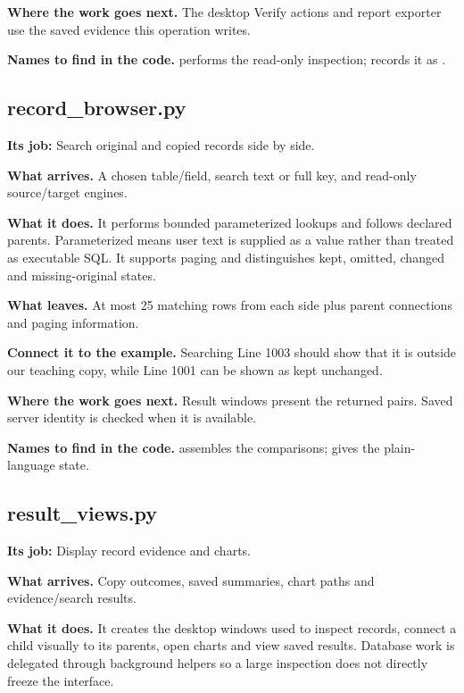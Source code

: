 \textbf{Where the work goes next.} The desktop Verify actions and report exporter use the saved evidence this operation writes.

\textbf{Names to find in the code.}  performs the read-only inspection;  records it as .


\subsection{record\_browser.py}

\textbf{Its job:} Search original and copied records side by side.

\textbf{What arrives.} A chosen table/field, search text or full key, and read-only source/target engines.

\textbf{What it does.} It performs bounded parameterized lookups and follows declared parents. Parameterized means user text is supplied as a value rather than treated as executable SQL. It supports paging and distinguishes kept, omitted, changed and missing-original states.

\textbf{What leaves.} At most 25 matching rows from each side plus parent connections and paging information.

\textbf{Connect it to the example.} Searching Line 1003 should show that it is outside our teaching copy, while Line 1001 can be shown as kept unchanged.

\textbf{Where the work goes next.} Result windows present the returned pairs. Saved server identity is checked when it is available.

\textbf{Names to find in the code.}  assembles the comparisons;  gives the plain-language state.


\subsection{result\_views.py}

\textbf{Its job:} Display record evidence and charts.

\textbf{What arrives.} Copy outcomes, saved summaries, chart paths and evidence/search results.

\textbf{What it does.} It creates the desktop windows used to inspect records, connect a child visually to its parents, open charts and view saved results. Database work is delegated through background helpers so a large inspection does not directly freeze the interface.

